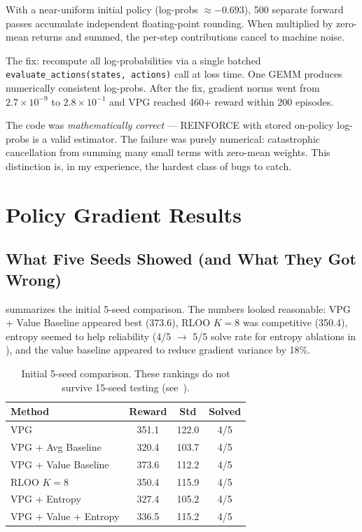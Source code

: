 \documentclass{article}
\begin{document}
With a near-uniform initial policy (log-probs $\approx -0.693$), 500 separate forward passes accumulate independent floating-point rounding.
When multiplied by zero-mean returns and summed, the per-step contributions cancel to machine noise.

The fix: recompute all log-probabilities via a single batched \texttt{evaluate\_actions(states, actions)} call at loss time.
One GEMM produces numerically consistent log-probs.
After the fix, gradient norms went from $2.7 \times 10^{-9}$ to $2.8 \times 10^{-1}$ and VPG reached 460+ reward within 200 episodes.

The code was \emph{mathematically correct} --- REINFORCE with stored on-policy log-probs is a valid estimator.
The failure was purely numerical: catastrophic cancellation from summing many small terms with zero-mean weights.
This distinction is, in my experience, the hardest class of bugs to catch.

\section{Policy Gradient Results}
\label{sec:pg}

\subsection{What Five Seeds Showed (and What They Got Wrong)}
\label{sec:initial}

 summarizes the initial 5-seed comparison.
The numbers looked reasonable: VPG + Value Baseline appeared best (373.6), RLOO $K{=}8$ was competitive (350.4), entropy seemed to help reliability (4/5 $\to$ 5/5 solve rate for entropy ablations in ), and the value baseline appeared to reduce gradient variance by 18\%.

\begin{table}[h]
\caption{Initial 5-seed comparison. These rankings do not survive 15-seed testing (see~).}
\label{tab:main5}
\centering
\small
\begin{tabular}{lccc}
\toprule
\textbf{Method} & \textbf{Reward} & \textbf{Std} & \textbf{Solved} \\
\midrule
VPG                   & 351.1 & 122.0 & 4/5 \\
VPG + Avg Baseline    & 320.4 & 103.7 & 4/5 \\
VPG + Value Baseline  & 373.6 & 112.2 & 4/5 \\
RLOO $K{=}8$          & 350.4 & 115.9 & 4/5 \\
VPG + Entropy         & 327.4 & 105.2 & 4/5 \\
VPG + Value + Entropy & 336.5 & 115.2 & 4/5 \\
\bottomrule
\end{tabular}
\end{table}
\end{document}
